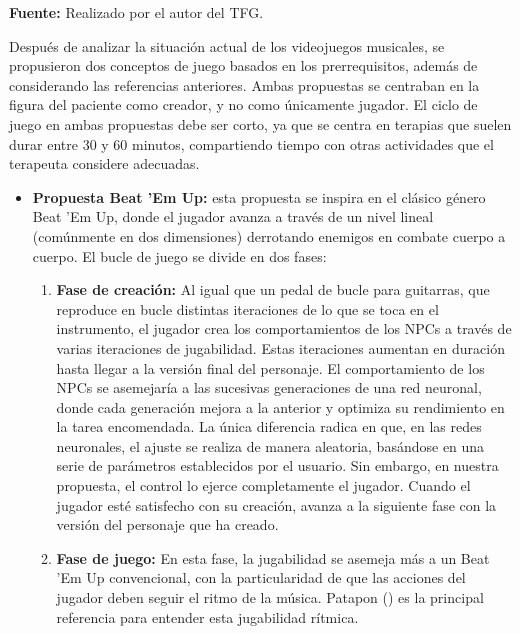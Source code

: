 \begin{center}
	\textbf{Fuente:} Realizado por el autor del TFG.
\end{center}

Después de analizar la situación actual de los videojuegos musicales, se propusieron dos conceptos de juego basados en los prerrequisitos, además de considerando las referencias anteriores. Ambas propuestas se centraban en la figura del paciente como creador, y no como únicamente jugador. El ciclo de juego en ambas propuestas debe ser corto, ya que se centra en terapias que suelen durar entre 30 y 60 minutos, compartiendo tiempo con otras actividades que el terapeuta considere adecuadas.

\begin{itemize}
	\item \textbf{Propuesta Beat 'Em Up:} esta propuesta se inspira en el clásico género Beat 'Em Up, donde el jugador avanza a través de un nivel lineal (comúnmente en dos dimensiones) derrotando enemigos en combate cuerpo a cuerpo. El bucle de juego se divide en dos fases:
	\begin{enumerate}
		\item \textbf{Fase de creación:} Al igual que un pedal de bucle para guitarras, que reproduce en bucle distintas iteraciones de lo que se toca en el instrumento, el jugador crea los comportamientos de los NPCs a través de varias iteraciones de jugabilidad. Estas iteraciones aumentan en duración hasta llegar a la versión final del personaje. El comportamiento de los NPCs se asemejaría a las sucesivas generaciones de una red neuronal, donde cada generación mejora a la anterior y optimiza su rendimiento en la tarea encomendada. La única diferencia radica en que, en las redes neuronales, el ajuste se realiza de manera aleatoria, basándose en una serie de parámetros establecidos por el usuario. Sin embargo, en nuestra propuesta, el control lo ejerce completamente el jugador. Cuando el jugador esté satisfecho con su creación, avanza a la siguiente fase con la versión del personaje que ha creado.
		
		\item \textbf{Fase de juego:} En esta fase, la jugabilidad se asemeja más a un Beat 'Em Up convencional, con la particularidad de que las acciones del jugador deben seguir el ritmo de la música. Patapon (\cite{PATAPON:2007}) es la principal referencia para entender esta jugabilidad rítmica.
	\end{enumerate}
	

\end{itemize}

